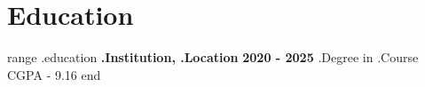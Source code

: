 \section{Education}
  \resumeSubHeadingListStart
  {{range .education}}
    \resumeSubheading
      {\textbf{ {{.Institution}}, {{.Location}} }}{\textbf{2020 - 2025}}
      { {{.Degree}} in {{.Course}}}{
      CGPA - 9.16
      }
  \resumeSubHeadingListEnd
  {{end}}
